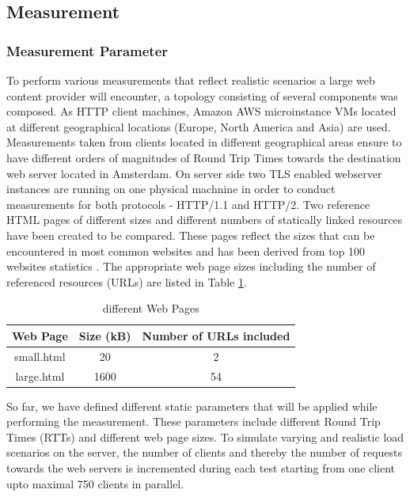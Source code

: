 \subsection{Measurement}
\subsubsection{Measurement Parameter}
\label{subsec:measurements}
To perform various measurements that reflect realistic scenarios a large web content provider will encounter, a topology consisting of several components was composed. As HTTP client machines, Amazon AWS microinstance VMs \cite{amazon} located at different geographical locations (Europe, North America and Asia) are used. Measurements taken from clients located in different geographical areas ensure to have different orders of magnitudes of Round Trip Times towards the destination web server located in Amsterdam. On server side two TLS enabled webserver instances are running on one physical machnine in order to conduct measurements for both protocols - HTTP/1.1 and HTTP/2. Two reference HTML pages of different sizes and different numbers of statically linked resources have been created to be compared. These pages reflect the sizes that can be encountered in most common websites and has been derived from top 100 websites statistics \cite{httparchive}. The appropriate web page sizes including the number of referenced resources (URLs) are listed in Table \ref{table:pages}.

\begin{table}[h]
	\centering
\begin{tabular}{ | c | c | c | }

\hline
\textbf{Web Page} & \textbf{Size (kB)} & \textbf{Number of URLs included}\\ \hline \hline
small.html &  20 & 2 \\ \hline
large.html &  1600 & 54 \\
\hline
\end{tabular}
\caption{different Web Pages}
\label{table:pages}
\end{table}

So far, we have defined different static parameters that will be applied while performing the measurement. These parameters include different Round Trip Times (RTTs) and different web page sizes.  
To simulate varying and realistic load scenarios on the server, the number of clients and thereby the number of requests towards the web servers is incremented during each test starting from one client upto maximal 750 clients in parallel.
\\  
